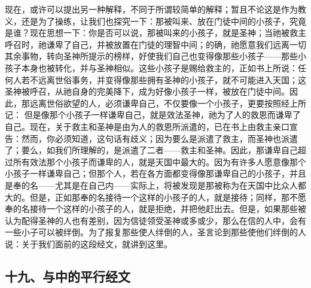 现在，或许可以提出另一种解释，不同于所谓较简单的解释；暂且不论这是作为教义，还是为了操练，让我们也探究一下：那被叫来、放在门徒中间的小孩子，究竟是谁？现在思想一下：你是否可以说，那被叫来的小孩子，就是圣神；当祂被救主呼召时，祂谦卑了自己，并被放置在门徒的理智中间；的确，祂愿意我们远离一切其余事物，转向圣神所提示的榜样，好使我们自己也变得像那些小孩子——那些小孩子本身也被转化，并与圣神相似。这些小孩子是赐给救主的，正如书上所说：任何人若不远离世俗事务，并变得像那些拥有圣神的小孩子，就不可能进入天国；这圣神被呼召，从祂自身的完美降下，成为好像小孩子一样，被放在门徒中间。因此，那远离世俗欲望的人，必须谦卑自己，不仅要像一个小孩子，更要按照经上所记： 但是像那个小孩子一样谦卑自己，就是效法圣神，祂为了人的救恩而谦卑了自己。现在，关于救主和圣神是由为人的救恩所派遣的，已在书上由救主亲口宣告：然而，你必须知道，这句话有歧义；因为要么是派遣了救主，而圣神也派遣了；要么，如我们所理解的，是派遣了二者——救主和圣神。因此，那谦卑自己超过所有效法那个小孩子而谦卑的人，就是天国中最大的。因为有许多人愿意像那个小孩子一样谦卑自己；但那个人，若在各方面都变得像那谦卑自己的小孩子，并且是奉的名——尤其是在自己内——实际上，将被发现是那被称为在天国中比众人都大的。但是，正如那奉的名接待一个这样的小孩子的人，就是接待；同样，那不愿奉的名接待一个这样的小孩子的人，就是拒绝，并把他赶出去。但是，如果那些被认为配得圣神的人也有差别，因为信徒领受圣神或多或少，那么在信的人中，会有一些小子可以被绊倒。为了报复那些使人绊倒的人，圣言论到那些使他们绊倒的人说：关于我们面前的这段经文，就讲到这里。\par


\subsection{十九、与中的平行经文}

